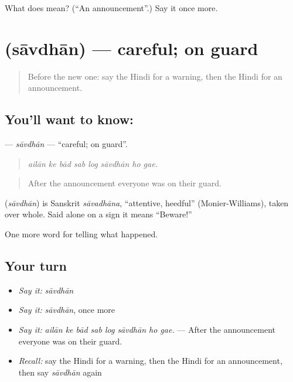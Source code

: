 \begin{tcolorbox}[breakable,colback=teal!4,colframe=teal!35!black,title={Before you move on}]
What does  mean? (\textquotedblleft{}An announcement\textquotedblright{}.) Say it once more.
\end{tcolorbox}
\section[\texorpdfstring{\hi{सावधान} (sāvdhān)}{सावधान (sāvdhān)}]{ (sāvdhān) — careful; on guard}

\label{lesson:HI-C302-savdhan}



\begin{quote}
Before the new one: say the Hindi for a warning, then the Hindi for an announcement.
\end{quote}

\subsection*{You'll want to know: }
\textbf{} — \emph{sāvdhān} — \textquotedblleft{}careful; on guard\textquotedblright{}.

\begin{quote}
       
\end{quote}

\begin{quote}
\emph{ailān ke bād sab log sāvdhān ho gae.}
\end{quote}

\begin{quote}
After the announcement everyone was on their guard.
\end{quote}

\begin{cousinweb}
\textbf{} (\emph{sāvdhān}) is Sanskrit \emph{sāvadhāna}, \textquotedblleft{}attentive, heedful\textquotedblright{} (Monier-Williams), taken over whole. Said alone on a sign it means \textquotedblleft{}Beware!\textquotedblright{}
\end{cousinweb}

\begin{grammarlens}[title={What you've built}]
One more word for telling what happened.
\end{grammarlens}

\subsection*{Your turn}
\begin{itemize}
\raggedright
  \item \emph{Say it:} \emph{sāvdhān}
  \item \emph{Say it:} \emph{sāvdhān}, once more
  \item \emph{Say it:} \emph{ailān ke bād sab log sāvdhān ho gae.} — After the announcement everyone was on their guard.
  \item \emph{Recall:} say the Hindi for a warning, then the Hindi for an announcement, then say \emph{sāvdhān} again
\end{itemize}

